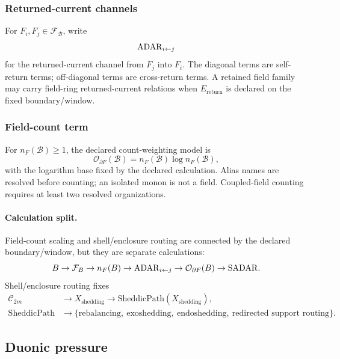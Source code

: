 \subsubsection{Returned-current channels}\label{subsec:returned-current-channels}
For \(F_i,F_j\in\mathcal F_{\mathcal B}\), write
\[
\mathrm{ADAR}_{i\leftarrow j}
\]
for the returned-current channel from \(F_j\) into \(F_i\). The diagonal terms are self-return terms; off-diagonal terms are cross-return terms. A retained field family may carry field-ring returned-current relations when \(E_{\mathrm{return}}\) is declared on the fixed boundary/window.

\subsubsection{Field-count term}\label{subsec:field-count-term}
For \(n_F(\mathcal B)\ge1\), the declared count-weighting model is
\begin{equation}
\mathcal O_{\partial F}(\mathcal B)=n_F(\mathcal B)\log n_F(\mathcal B),
\label{eq:field-count-term}
\end{equation}
with the logarithm base fixed by the declared calculation. Alias names are
resolved before counting; an isolated monon is not a field. Coupled-field
counting requires at least two resolved organizations.

\paragraph{Calculation split.}
Field-count scaling and shell/enclosure routing are connected by the declared boundary/window, but they are separate calculations:
\[
B\to \mathcal F_{B}\to n_F(B)\to \mathrm{ADAR}_{i\leftarrow j}\to \mathcal O_{\partial F}(B)\to \mathrm{SADAR}.
\]
Shell/enclosure routing fixes
\[
\begin{aligned}
\mathcal C_{2m}
&\to X_{\mathrm{shedding}}
\to \mathrm{SheddicPath}(X_{\mathrm{shedding}}),\\
\mathrm{SheddicPath}
&\to
\{\text{rebalancing},\ \text{exoshedding},\ \text{endoshedding},\ \text{redirected support routing}\}.
\end{aligned}
\]




\subsection{Duonic pressure}\label{sec:duonic-pressure-inertia}

